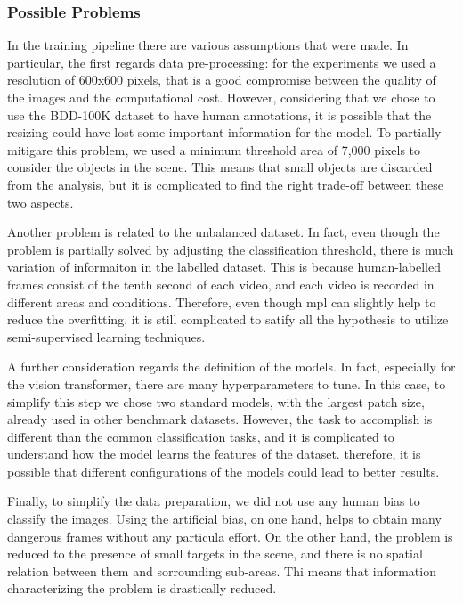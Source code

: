\subsubsection{Possible Problems}
In the training pipeline there are various assumptions that were made. 
In particular, the first regards data pre-processing: for the experiments we 
used a resolution of 600x600 pixels, that is a good compromise between the 
quality of the images and the computational cost. However, considering that 
we chose to use the BDD-100K dataset to have human annotations, it is possible 
that the resizing could have lost some important information for the model. 
To partially mitigare this problem, we used a minimum threshold area of 7,000 
pixels to consider the objects in the scene. This means that small objects 
are discarded from the analysis, but it is complicated to find the right 
trade-off between these two aspects.

Another problem is related to the unbalanced dataset. In fact, even though the 
problem is partially solved by adjusting the classification threshold, 
there is much variation of informaiton in the labelled dataset. This is because 
human-labelled frames consist of the tenth second of each video, and each 
video is recorded in different areas and conditions. Therefore, even though 
\acl{mpl} can slightly help to reduce the overfitting, it is still complicated 
to satify all the hypothesis to utilize semi-supervised learning techniques.

A further consideration regards the definition of the models. In fact, especially 
for the vision transformer, there are many hyperparameters to tune. In this case, 
to simplify this step we chose two standard models, with the largest patch size,
already used in other benchmark datasets. However, the task to accomplish is 
different than the common classification tasks, and it is complicated to understand 
how the model learns the features of the dataset. therefore, it is possible 
that different configurations of the models could lead to better results.

Finally, to simplify the data preparation, we did not use any human bias to 
classify the images. Using the artificial bias, on one hand, helps to obtain 
many dangerous frames without any particula effort. On the other hand, the problem 
is reduced to the presence of small targets in the scene, and there is no spatial 
relation between them and sorrounding sub-areas. Thi means that information 
characterizing the problem is drastically reduced.

